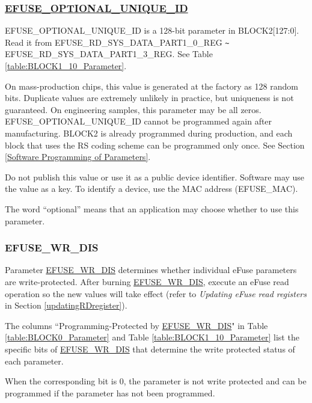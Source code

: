 \documentclass[main\_\_EN.tex]{subfiles}
\begin{document}
\subsubsection{\texorpdfstring{\hyperref[fielddesc:EFUSEOPTIONALUNIQUEID]{EFUSE\_OPTIONAL\_UNIQUE\_ID}}{EFUSE\_OPTIONAL\_UNIQUE\_ID}}
\label{sec:efuse-optional-unique-id}

EFUSE\_OPTIONAL\_UNIQUE\_ID is a 128-bit parameter in BLOCK2[127:0]. Read it from EFUSE\_RD\_SYS\_DATA\_PART1\_0\_REG \verb+~+ EFUSE\_RD\_SYS\_DATA\_PART1\_3\_REG. See Table \ref{table:BLOCK1_10_Parameter}.

On mass-production chips, this value is generated at the factory as 128 random bits. Duplicate values are extremely unlikely in practice, but uniqueness is not guaranteed. On engineering samples, this parameter may be all zeros. EFUSE\_OPTIONAL\_UNIQUE\_ID cannot be programmed again after manufacturing. BLOCK2 is already programmed during production, and each block that uses the RS coding scheme can be programmed only once. See Section \ref{Software Programming of Parameters}.

Do not publish this value or use it as a public device identifier. Software may use the value as a key. To identify a device, use the MAC address (EFUSE\_MAC).

The word ``optional'' means that an application may choose whether to use this parameter.

\subsubsection{EFUSE\_WR\_DIS}\label{section:EFUSEWRDISABLE}

Parameter \hyperref[fielddesc:EFUSEWRDIS]{EFUSE\_WR\_DIS} determines whether individual eFuse parameters are write-protected. After burning \hyperref[fielddesc:EFUSEWRDIS]{EFUSE\_WR\_DIS}, execute an eFuse read operation so the new values will take effect (refer to \textit{Updating eFuse read registers} in Section \ref{updatingRDregister}).

The columns ``Programming-Protected by \hyperref[fielddesc:EFUSEWRDIS]{EFUSE\_WR\_DIS}" in Table  \ref{table:BLOCK0_Parameter} and Table \ref{table:BLOCK1_10_Parameter} list the specific bits of \hyperref[fielddesc:EFUSEWRDIS]{EFUSE\_WR\_DIS} that determine the write protected status of each parameter.

When the corresponding bit is 0, the parameter is not write protected and can be programmed if the parameter has not been programmed.
\end{document}
